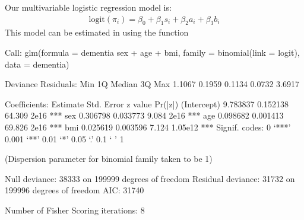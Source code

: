 \documentclass[letterpaper,10pt,english]{jupyterBook}
\begin{document}
\sphinxAtStartPar
Our multivariable logistic regression model is:
\begin{equation*}
\begin{split}
\mathrm{logit}(\pi_i) = \beta_0 + \beta_1 s_i + \beta_2 a_i + \beta_3 b_i
\end{split}
\end{equation*}
\sphinxAtStartPar
This model can be estimated in using the  function

\begin{sphinxVerbatim}[commandchars=\\\{\}]
  
              
\end{sphinxVerbatim}

\begin{sphinxVerbatim}[commandchars=\\\{\}]
Call:
glm(formula = dementia \PYGZti{} sex + age + bmi, family = binomial(link = \PYGZdq{}logit\PYGZdq{}), 
    data = dementia)

Deviance Residuals: 
    Min       1Q   Median       3Q      Max  
\PYGZhy{}1.1067  \PYGZhy{}0.1959  \PYGZhy{}0.1134  \PYGZhy{}0.0732   3.6917  

Coefficients:
             Estimate Std. Error z value Pr(\PYGZgt{}|z|)    
(Intercept) \PYGZhy{}9.783837   0.152138 \PYGZhy{}64.309  \PYGZlt{} 2e\PYGZhy{}16 ***
sex          0.306798   0.033773   9.084  \PYGZlt{} 2e\PYGZhy{}16 ***
age          0.098682   0.001413  69.826  \PYGZlt{} 2e\PYGZhy{}16 ***
bmi         \PYGZhy{}0.025619   0.003596  \PYGZhy{}7.124 1.05e\PYGZhy{}12 ***
\PYGZhy{}\PYGZhy{}\PYGZhy{}
Signif. codes:  0 ‘***’ 0.001 ‘**’ 0.01 ‘*’ 0.05 ‘.’ 0.1 ‘ ’ 1

(Dispersion parameter for binomial family taken to be 1)

    Null deviance: 38333  on 199999  degrees of freedom
Residual deviance: 31732  on 199996  degrees of freedom
AIC: 31740

Number of Fisher Scoring iterations: 8
\end{sphinxVerbatim}
\end{document}
